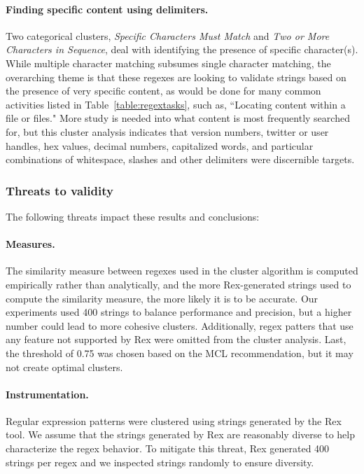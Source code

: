 \paragraph{Finding specific content using delimiters.}  Two categorical clusters, \emph{Specific Characters Must Match} and \emph{Two or More Characters in Sequence}, deal with identifying the presence of specific character(s).  While multiple character matching subsumes single character matching, the overarching theme is that these regexes are looking to validate strings based on the presence of very specific content, as would be done for many common activities listed in Table~\ref{table:regextasks}, such as, ``Locating content within a file or files."  More study is needed into what content is most frequently searched for, but this cluster analysis indicates that version numbers, twitter or user handles, hex values, decimal numbers, capitalized words, and particular combinations of whitespace, slashes and other delimiters were discernible targets.

\subsubsection{Threats to validity}
The following threats impact these results and conclusions:

\paragraph{Measures.}  The similarity measure between regexes used in the cluster algorithm is computed empirically rather than analytically, and the more Rex-generated strings used to compute the similarity measure, the more likely it is to be accurate. Our experiments used 400 strings to balance performance and precision, but a higher number could lead to more cohesive clusters. Additionally, regex patters that use any feature not supported by Rex were omitted from the cluster analysis. Last, the threshold of 0.75 was chosen based on the MCL recommendation, but it may not create optimal clusters.

\paragraph{Instrumentation.} Regular expression patterns were clustered using strings generated by the Rex tool. We assume that the strings generated by Rex are reasonably diverse to help characterize the regex behavior. To mitigate this threat, Rex generated 400 strings per regex and we inspected strings randomly to ensure diversity.

